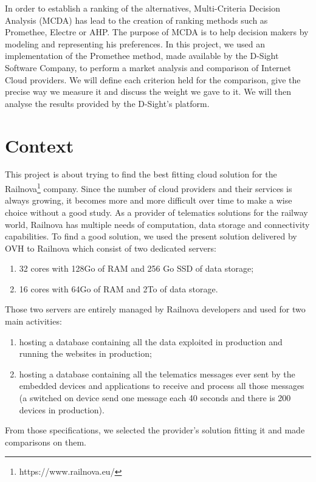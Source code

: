 \documentclass[a4paper,11pt]{article}
\begin{document}
In order to establish a ranking of the alternatives, Multi-Criteria Decision Analysis (MCDA) has lead to the creation of ranking methods such as Promethee, Electre or AHP. The purpose of MCDA is to help decision makers by modeling and representing his preferences. In this project, we used an implementation of the Promethee method, made available by the D-Sight Software Company, to perform a market analysis and comparison of Internet \og Cloud \fg{} providers. We will define each criterion held for the comparison, give the precise way we measure it and discuss the weight we gave to it. We will then analyse the results provided by the D-Sight's platform.\\ %


\section{Context}
This project is about trying to find the best fitting cloud solution for the Railnova\footnote{https://www.railnova.eu/} company. Since the number of cloud providers and their services is always growing, it becomes more and more difficult over time to make a wise choice without a good study. As a provider of telematics solutions for the railway world, Railnova has multiple needs of computation, data storage and connectivity capabilities. To find a good solution, we used the present solution delivered by OVH to Railnova which consist of two dedicated servers:
\begin{enumerate}
  \item 32 cores with 128Go of RAM and 256 Go SSD of data storage;
  \item 16 cores with 64Go of RAM and 2To of data storage.
\end{enumerate}
Those two servers are entirely managed by Railnova developers and used for two main activities:
\begin{enumerate}
  \item hosting a database containing all the data exploited in production and running the websites in production;
  \item hosting a database containing all the telematics messages ever sent by the embedded devices and applications to receive and process all those messages (a switched on device send one message each 40 seconds and there is 200 devices in production).
\end{enumerate}
From those specifications, we selected the provider's solution fitting it and made comparisons on them.\\
\end{document}
